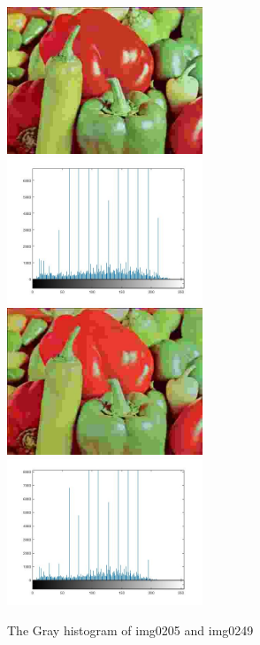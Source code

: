 \begin{figure}[htbp] %
   \centering
   		\includegraphics[width=2.3in]{images/img0205.jpg} 
		\includegraphics[width=2.3in]{images/imgMDID0205.jpg} 
		\includegraphics[width=2.3in]{images/img0249.jpg} 
		\includegraphics[width=2.3in]{images/imgMDID0249.jpg} 
          	   \caption{The Gray histogram of img0205 and img0249 }
\end{figure}

